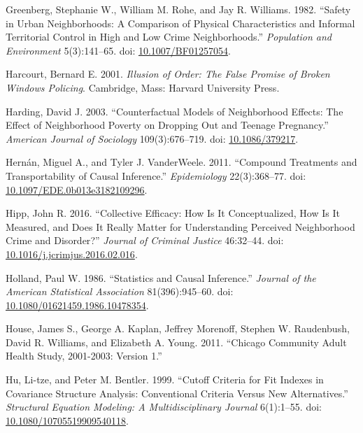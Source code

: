 \documentclass [11pt, proquest] {uwthesis}[2015/03/03]
\newlength{\cslhangindent}
\newenvironment{CSLReferences}[2]%
{\setlength{\parindent}{0pt}%
\everypar{\setlength{\hangindent}{\cslhangindent}}\ignorespaces}%
{\par}
\begin{document}
\begin{CSLReferences}{1}{0}
\leavevmode\hypertarget{ref-greenbergSafetyUrbanNeighborhoods1982}{}%
Greenberg, Stephanie W., William M. Rohe, and Jay R. Williams. 1982. {``Safety in {Urban Neighborhoods}: {A Comparison} of {Physical Characteristics} and {Informal Territorial Control} in {High} and {Low Crime Neighborhoods}.''} \emph{Population and Environment} 5(3):141--65. doi: \href{https://doi.org/10.1007/BF01257054}{10.1007/BF01257054}.

\leavevmode\hypertarget{ref-harcourtIllusionOrderFalse2001}{}%
Harcourt, Bernard E. 2001. \emph{Illusion of {Order}: {The False Promise} of {Broken Windows Policing}}. {Cambridge, Mass}: {Harvard University Press}.

\leavevmode\hypertarget{ref-hardingCounterfactualModelsNeighborhood2003}{}%
Harding, David J. 2003. {``Counterfactual {Models} of {Neighborhood Effects}: {The Effect} of {Neighborhood Poverty} on {Dropping Out} and {Teenage Pregnancy}.''} \emph{American Journal of Sociology} 109(3):676--719. doi: \href{https://doi.org/10.1086/379217}{10.1086/379217}.

\leavevmode\hypertarget{ref-hernanCompoundTreatmentsTransportability2011}{}%
Hernán, Miguel A., and Tyler J. VanderWeele. 2011. {``Compound {Treatments} and {Transportability} of {Causal Inference}.''} \emph{Epidemiology} 22(3):368--77. doi: \href{https://doi.org/10.1097/EDE.0b013e3182109296}{10.1097/EDE.0b013e3182109296}.

\leavevmode\hypertarget{ref-hippCollectiveEfficacyHow2016}{}%
Hipp, John R. 2016. {``Collective {Efficacy}: {How} Is It {Conceptualized}, {How} Is It {Measured}, and {Does} It {Really Matter} for {Understanding Perceived Neighborhood Crime} and {Disorder}?''} \emph{Journal of Criminal Justice} 46:32--44. doi: \href{https://doi.org/10.1016/j.jcrimjus.2016.02.016}{10.1016/j.jcrimjus.2016.02.016}.

\leavevmode\hypertarget{ref-hollandStatisticsCausalInference1986}{}%
Holland, Paul W. 1986. {``Statistics and {Causal Inference}.''} \emph{Journal of the American Statistical Association} 81(396):945--60. doi: \href{https://doi.org/10.1080/01621459.1986.10478354}{10.1080/01621459.1986.10478354}.

\leavevmode\hypertarget{ref-houseChicagoCommunityAdult2011}{}%
House, James S., George A. Kaplan, Jeffrey Morenoff, Stephen W. Raudenbush, David R. Williams, and Elizabeth A. Young. 2011. {``Chicago {Community Adult Health Study}, 2001-2003: {Version} 1.''}

\leavevmode\hypertarget{ref-huCutoffCriteriaFit1999}{}%
Hu, Li-tze, and Peter M. Bentler. 1999. {``Cutoff Criteria for Fit Indexes in Covariance Structure Analysis: {Conventional} Criteria Versus New Alternatives.''} \emph{Structural Equation Modeling: A Multidisciplinary Journal} 6(1):1--55. doi: \href{https://doi.org/10.1080/10705519909540118}{10.1080/10705519909540118}.


\end{CSLReferences}
\end{document}
